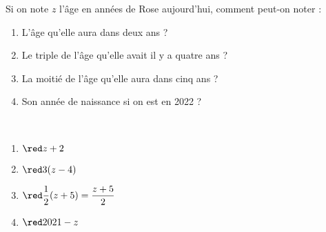 \begin{exercice*}
   Si on note $z$ l'âge en années de Rose aujourd'hui, comment peut-on noter :
   \begin{enumerate}
      \item L'âge qu'elle aura dans deux ans ?
      \item Le triple de l'âge qu'elle avait il y a quatre ans ?
      \item La moitié de l'âge qu'elle aura dans cinq ans ?
      \item Son année de naissance si on est en 2022 ?
   \end{enumerate}
\end{exercice*}

\begin{corrige}
   \ \\ [-5mm]
   \begin{multicols}{2}
      \begin{enumerate}
         \item $\red z+2$
         \item $\red 3(z-4)$
         \item $\red \dfrac12(z+5) =\dfrac{z+5}{2}$ \smallskip
         \item $\red 2021-z$
      \end{enumerate}
   \end{multicols}
\end{corrige}